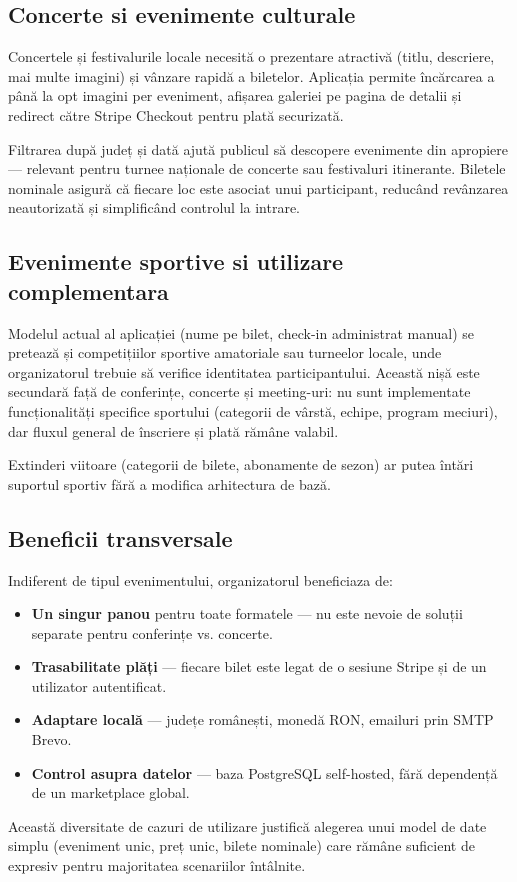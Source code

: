 \subsection{Concerte si evenimente culturale}

Concertele și festivalurile locale necesită o prezentare atractivă (titlu, descriere, mai multe imagini) și vânzare rapidă a biletelor. Aplicația permite încărcarea a până la opt imagini per eveniment, afișarea galeriei pe pagina de detalii și redirect către Stripe Checkout pentru plată securizată.

Filtrarea după județ și dată ajută publicul să descopere evenimente din apropiere — relevant pentru turnee naționale de concerte sau festivaluri itinerante. Biletele nominale asigură că fiecare loc este asociat unui participant, reducând revânzarea neautorizată și simplificând controlul la intrare.

\subsection{Evenimente sportive si utilizare complementara}

Modelul actual al aplicației (nume pe bilet, check-in administrat manual) se pretează și competițiilor sportive amatoriale sau turneelor locale, unde organizatorul trebuie să verifice identitatea participantului. Această nișă este secundară față de conferințe, concerte și meeting-uri: nu sunt implementate funcționalități specifice sportului (categorii de vârstă, echipe, program meciuri), dar fluxul general de înscriere și plată rămâne valabil.

Extinderi viitoare (categorii de bilete, abonamente de sezon) ar putea întări suportul sportiv fără a modifica arhitectura de bază.

\subsection{ Beneficii transversale}



Indiferent de tipul evenimentului, organizatorul beneficiaza de: 

	\begin{itemize}
		\item \textbf{Un singur panou} pentru toate formatele — nu este nevoie de soluții separate pentru conferințe vs. concerte.
		\item \textbf{Trasabilitate plăți} — fiecare bilet este legat de o sesiune Stripe și de un utilizator autentificat.
		\item \textbf{Adaptare locală} — județe românești, monedă RON, emailuri prin SMTP Brevo.
		\item \textbf{Control asupra datelor} — baza PostgreSQL self-hosted, fără dependență de un mar\-ketplace global.
	\end{itemize}
	
	\vspace{1em} %
	
	Această diversitate de cazuri de utilizare justifică alegerea unui model de date simplu (eveniment unic, preț unic, bilete nominale) care rămâne suficient de expresiv pentru majoritatea scenariilor întâlnite.
	
